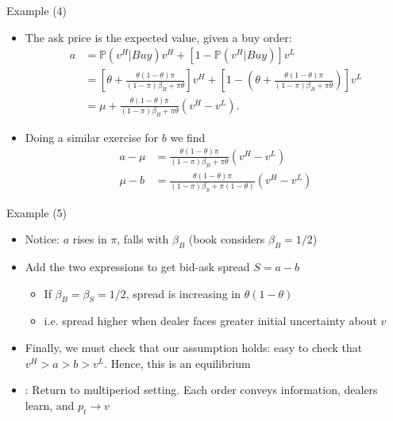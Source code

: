 \documentclass[english,10pt]{beamer}
\begin{document}
\begin{frame}{Example (4)}
\begin{itemize}
	\item The ask price is the expected value, given a buy order:
	\begin{align*}
		a 
		& = \mathbb{P}(v^H| Buy) v^H + [1-\mathbb{P}(v^H| Buy)] v^L \\
		& = \left[ \theta + \frac{\theta(1-\theta) \pi}{(1-\pi)\beta_B+\pi\theta} \right] v^H + \left[ 1 - \left( \theta + \frac{\theta(1-\theta) \pi}{(1-\pi)\beta_B+\pi\theta} \right) \right] v^L\\
		& = \mu + \frac{\theta(1-\theta) \pi}{(1-\pi)\beta_B+\pi\theta} (v^H -v^L).
	\end{align*}
	\item Doing a similar exercise for $b$ we find
	\begin{align*}
		a - \mu 		&= \frac{\theta(1-\theta) \pi}{(1-\pi)\beta_B+\pi\theta}(v^H-v^L) \\
		\mu - b 		&= \frac{\theta(1-\theta) \pi}{(1-\pi)\beta_S+\pi(1-\theta)}(v^H-v^L)
	\end{align*}
\end{itemize}
\end{frame}


\begin{frame}[label=example]{Example (5)}
\begin{itemize}
	\item Notice: $a$ rises in $\pi$, falls with $\beta_B$ (book considers $\beta_B=1/2$)
	\item Add the two expressions to get bid-ask spread $S = a-b$
	\begin{itemize}
		\item If $\beta_B=\beta_S=1/2$, spread is increasing in $\theta(1-\theta)$
		\item i.e. spread higher when dealer faces greater initial uncertainty about $v$
	\end{itemize}
	\item Finally, we must check that our assumption holds: easy to check that $v^H > a > b > v^L$. Hence, \alert{this is an equilibrium}
	\item {}: Return to multiperiod setting. Each order conveys information, dealers learn, and 
	\center
	$p_t \rightarrow v$
	\hyperlink{dynamics}{}
\end{itemize}
\end{frame}
\end{document}
